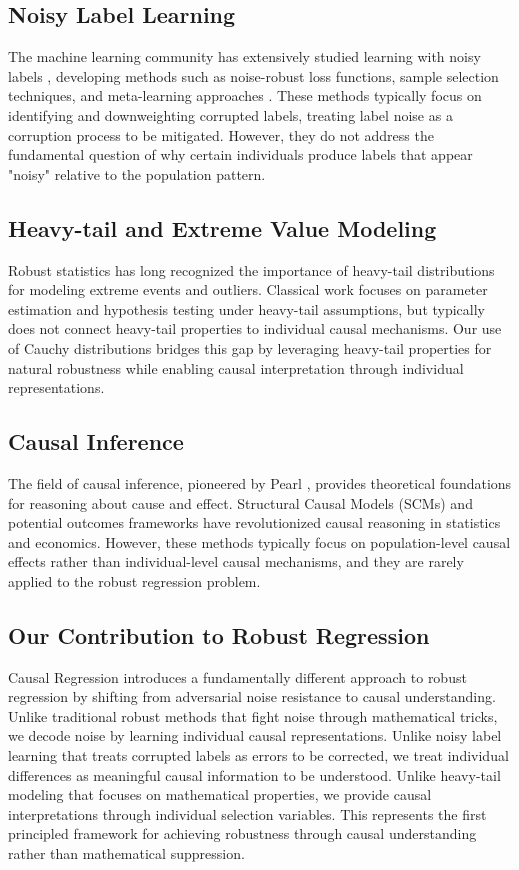 \documentclass[conference]{IEEEtran}
\begin{document}
\subsection{Noisy Label Learning}
The machine learning community has extensively studied learning with noisy labels \cite{natarajan2013learning}, developing methods such as noise-robust loss functions, sample selection techniques, and meta-learning approaches \cite{han2018co}. These methods typically focus on identifying and downweighting corrupted labels, treating label noise as a corruption process to be mitigated. However, they do not address the fundamental question of why certain individuals produce labels that appear "noisy" relative to the population pattern.

\subsection{Heavy-tail and Extreme Value Modeling}
Robust statistics has long recognized the importance of heavy-tail distributions for modeling extreme events and outliers. Classical work focuses on parameter estimation and hypothesis testing under heavy-tail assumptions, but typically does not connect heavy-tail properties to individual causal mechanisms. Our use of Cauchy distributions bridges this gap by leveraging heavy-tail properties for natural robustness while enabling causal interpretation through individual representations.

\subsection{Causal Inference}
The field of causal inference, pioneered by Pearl \cite{pearl2009causality}, provides theoretical foundations for reasoning about cause and effect. Structural Causal Models (SCMs) \cite{spirtes2000causation} and potential outcomes frameworks \cite{imbens2015causal} have revolutionized causal reasoning in statistics and economics. However, these methods typically focus on population-level causal effects rather than individual-level causal mechanisms, and they are rarely applied to the robust regression problem.

\subsection{Our Contribution to Robust Regression}
Causal Regression introduces a fundamentally different approach to robust regression by shifting from adversarial noise resistance to causal understanding. Unlike traditional robust methods that fight noise through mathematical tricks, we decode noise by learning individual causal representations. Unlike noisy label learning that treats corrupted labels as errors to be corrected, we treat individual differences as meaningful causal information to be understood. Unlike heavy-tail modeling that focuses on mathematical properties, we provide causal interpretations through individual selection variables. This represents the first principled framework for achieving robustness through causal understanding rather than mathematical suppression.
\end{document}
